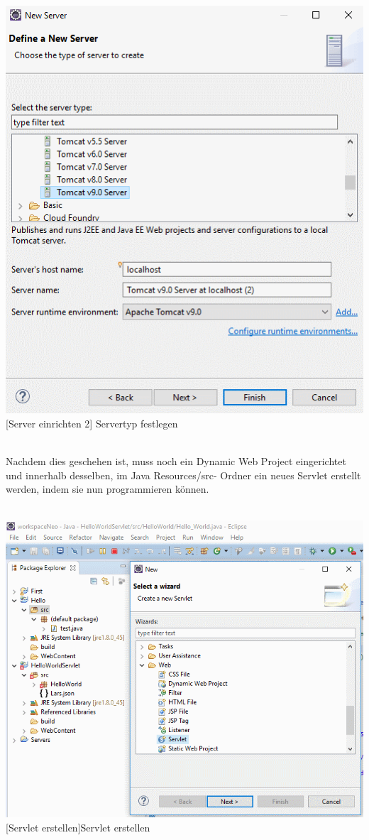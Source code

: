 \documentclass[12pt,a4paper,bibliography=totocnumbered,listof=totocnumbered]{scrartcl}
\begin{document}
\\
\vspace{1em}
\begin{minipage}{\linewidth}
	\centering
	\includegraphics[width=0.7\linewidth]{Bilder/Eclipse-ServerErstellen1.png}
	[Server einrichten 2]	{Servertyp festlegen}
	\label{fig:eclipse2}
\end{minipage}
\\

Nachdem dies geschehen ist, muss noch ein Dynamic Web Project eingerichtet und innerhalb desselben, im \glqq Java Resources/src\grqq-  Ordner ein neues Servlet erstellt werden, indem sie nun programmieren können.
\\
\\
\vspace{1em}
\begin{minipage}{\linewidth}
	\centering
	\includegraphics[width=0.7\linewidth]{Bilder/Eclipse-ServerErstellen2.png}
	[Servlet erstellen]{Servlet erstellen}	
	\label{fig:eclipse3}
\end{minipage}
\\
\end{document}
